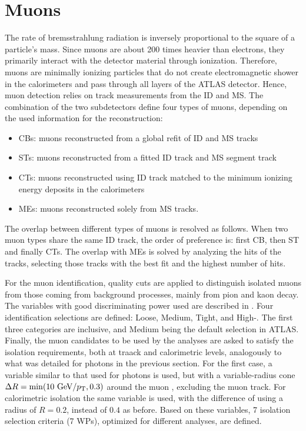 \section{Muons}



The rate of bremsstrahlung radiation is inversely proportional to the square of a particle's mass. Since muons are about 200 times heavier than electrons, they primarily interact with the detector material through ionization. Therefore, muons are minimally ionizing particles that do not create electromagnetic shower in the calorimeters and pass through all layers of the \ac{ATLAS} detector. Hence, muon detection relies on track measurements from the \ac{ID} and \ac{MS}. The combination of the two subdetectors define four types of muons, depending on the used information for the reconstruction:
\begin{itemize}
    \item \acp{CB}: muons reconstructed from a global refit of \ac{ID} and \ac{MS} tracks
    \item \acp{ST}: muons reconstructed from a fitted \ac{ID} track and \ac{MS} segment track
    \item \acp{CT}: muons reconstructed using \ac{ID} track matched to the minimum ionizing energy deposits in the calorimeters
    \item \acp{ME}: muons reconstructed solely from \ac{MS} tracks.
\end{itemize}


The overlap between different types of muons is resolved as follows. When two muon types share the same \ac{ID} track, the order of preference is: first \ac{CB}, then \ac{ST} and finally \acp{CT}. The overlap with \acp{ME} is solved by analyzing the hits of the tracks, selecting those tracks with the best fit and the highest number of hits.

For the muon identification, quality cuts are applied to distinguish isolated muons from those coming from background processes, mainly from pion and kaon decay.
The variables with good discriminating power used are described in . Four identification selections are defined: Loose, Medium, Tight, and High-\pt. The first three categories are inclusive, and Medium being the default selection in \ac{ATLAS}. Finally, the muon candidates to be used by the analyses are asked to satisfy the isolation requirements, both at traack and calorimetric levels, analogously to what was detailed for photons in the previous section. For the first case, a variable similar to that used for photons is used, but with a variable-radius cone \(\Delta R = \min(10~\text{GeV}/p_{\text{T}}, 0.3)\) around the muon \pt, excluding the muon track. For calorimetric isolation the same variable \etconefo is used, with the difference of using a radius of \(R=0.2\), instead of \(0.4\) as before. Based on these variables, 7 isolation selection criteria (7 \acp{WP}), optimized for different analyses, are defined.








